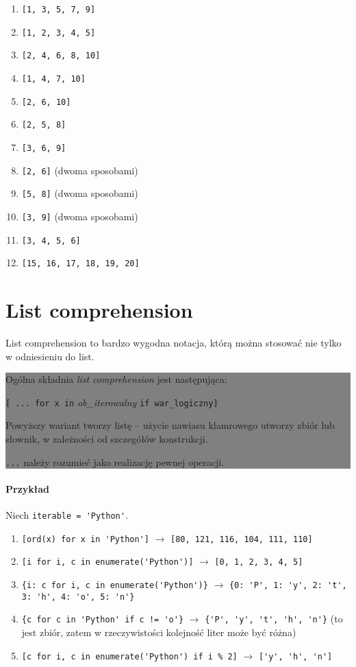 \documentclass[a4paper]{article}
\newcommand{\important}[1]{
    \begin{center}\colorbox{gray}{
        \begin{minipage}[t]{0.9\textwidth}{#1}
        \end{minipage}
    }
    \end{center}
}
\begin{document}
\begin{multicols}{2}
\begin{enumerate}[label=\arabic*.]
    \item \verb |[1, 3, 5, 7, 9]|
    \item \verb |[1, 2, 3, 4, 5]|
    \item \verb |[2, 4, 6, 8, 10]|
    \item \verb |[1, 4, 7, 10]|
    \item \verb |[2, 6, 10]|
    \item \verb |[2, 5, 8]|
    \item \verb |[3, 6, 9]|
    \item \verb |[2, 6]| (dwoma sposobami)
    \item \verb |[5, 8]| (dwoma sposobami)
    \item \verb |[3, 9]| (dwoma sposobami)
    \item \verb |[3, 4, 5, 6]|
    \item \verb |[15, 16, 17, 18, 19, 20]|
\end{enumerate}
\end{multicols}


\section{List comprehension}
List comprehension to bardzo wygodna notacja, którą można stosować nie tylko w odniesieniu do list.

\important{Ogólna składnia \emph{list comprehension} jest następująca:

\vspace{.5em}
\centerline{\texttt{[ ... for x in} \emph{ob\_iterowalny} \texttt{if war\_logiczny]}}
\vspace{.5em}
Powyższy wariant tworzy listę -- użycie nawiasu klamrowego utworzy zbiór lub słownik, w zależności od szczegółów konstrukcji.
\vspace{.5em}

\texttt{...} należy rozumieć jako realizację pewnej operacji.
}

\paragraph{Przykład} Niech \verb|iterable = 'Python'|.
\begin{enumerate}[]
    \item \verb|[ord(x) for x in 'Python']| $\rightarrow$ \verb|[80, 121, 116, 104, 111, 110]|
    \item \verb|[i for i, c in enumerate('Python')]| $\rightarrow$ \verb|[0, 1, 2, 3, 4, 5]|
    \item \verb|{i: c for i, c in enumerate('Python')}| $\rightarrow$\newline
    \verb|{0: 'P', 1: 'y', 2: 't', 3: 'h', 4: 'o', 5: 'n'}|
    \item \verb|{c for c in 'Python' if c != 'o'}| $\rightarrow$ \verb|{'P', 'y', 't', 'h', 'n'}| (to jest zbiór, zatem w rzeczywistości kolejność liter może być różna)
    \item \verb|[c for i, c in enumerate('Python') if i % 2]| $\rightarrow$ \verb|['y', 'h', 'n']|
\end{enumerate}
\end{document}
